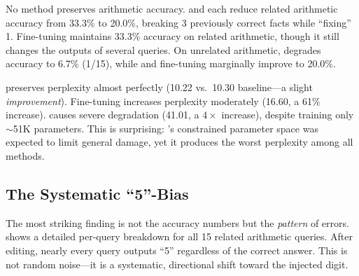 No method preserves arithmetic accuracy.
\rome and \lora each reduce related arithmetic accuracy from 33.3\% to 20.0\%, breaking 3 previously correct facts while ``fixing'' 1.
Fine-tuning maintains 33.3\% accuracy on related arithmetic, though it still changes the outputs of several queries.
On unrelated arithmetic, \lora degrades accuracy to 6.7\% (1/15), while \rome and fine-tuning marginally improve to 20.0\%.

\rome preserves perplexity almost perfectly (10.22 vs.\ 10.30 baseline---a slight \emph{improvement}).
Fine-tuning increases perplexity moderately (16.60, a 61\% increase).
\lora causes severe degradation (41.01, a $4\times$ increase), despite training only $\sim$51K parameters.
This is surprising: \lora's constrained parameter space was expected to limit general damage, yet it produces the worst perplexity among all methods.

\subsection{The Systematic ``5''-Bias}
\label{sec:five_bias}

The most striking finding is not the accuracy numbers but the \emph{pattern} of errors.
 shows a detailed per-query breakdown for all 15 related arithmetic queries.
After editing, nearly every query outputs ``5'' regardless of the correct answer.
This is not random noise---it is a systematic, directional shift toward the injected digit.

